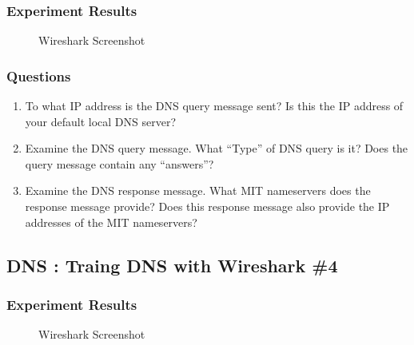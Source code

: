    \subsubsection*{Experiment Results}
         \vspace{-4mm}
    	\begin{figure}[!h]\centering
    		\caption{Wireshark Screenshot}
    	\end{figure}
        \vspace{-4mm}  
    \subsubsection*{Questions}
        \begin{enumerate}[label=\bfseries Problem \arabic*:,leftmargin=*,labelindent=1em]
        \addtocounter{enumi}{11}
            \item To what IP address is the DNS query message sent? 
            Is this the IP address of your default local DNS server?\\[0.2mm]
            \soln
            
            \item Examine the DNS query message. What “Type” of DNS query is it? 
            Does the query message contain any “answers”?\\[0.2mm]
            \soln
            
            \item Examine the DNS response message. What MIT nameservers does the response message provide? 
            Does this response message also provide the IP addresses of the MIT nameservers?\\[0.2mm]
            \soln
            
        \end{enumerate}
\subsection{DNS : Traing DNS with Wireshark \#4}
    \subsubsection*{Experiment Results}
    	\begin{figure}[!h]\centering
    		\caption{Wireshark Screenshot}
    	\end{figure}
        \vspace{-4mm}  
